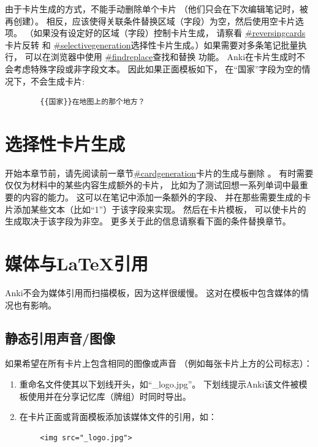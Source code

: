 \documentclass[a4paper]{book}
\newcounter{img}[chapter]
\begin{document}
	由于卡片生成的方式，不能手动删除单个卡片 （他们只会在下次编辑笔记时，被再创建）。 相反，应该使得关联条件替换区域（字段）为空，然后使用空卡片选项。 （如果没有设定好的区域（字段）控制卡片生成， 请察看
	\url{#reversingcards}卡片反转 和 \url{#selectivegeneration}选择性卡片生成。）如果需要对多条笔记批量执行， 可以在浏览器中使用
	\url{#findreplace}查找和替换 功能。
	Anki在卡片生成时不会考虑特殊字段或非字段文本。 因此如果正面模板如下， 在“国家”字段为空的情况下，不会生成卡片:
	
	\begin{shaded}\begin{verbatim}
		{{国家}}在地图上的那个地方？
		\end{verbatim}\end{shaded}
	\section{选择性卡片生成}
	开始本章节前，请先阅读前一章节\url{#cardgeneration}卡片的生成与删除 。
	有时需要仅仅为材料中的某些内容生成额外的卡片， 比如为了测试回想一系列单词中最重要的内容的能力。 这可以在笔记中添加一条额外的字段、 并在那些需要生成的卡片添加某些文本（比如“1”）于该字段来实现。 然后在卡片模板， 可以使卡片的生成取决于该字段为非空。 更多关于此的信息请察看下面的条件替换章节。
	
	\section{媒体与LaTeX引用}
	Anki不会为媒体引用而扫描模板，因为这样很缓慢。 这对在模板中包含媒体的情况也有影响。
	
	
	\subsection{静态引用声音/图像}
	如果希望在所有卡片上包含相同的图像或声音 （例如每张卡片上方的公司标志）：
	
\begin{enumerate}
	\itemsep1pt\parskip0pt
\item 重命名文件使其以下划线开头，如“\_logo.jpg”。 下划线提示Anki该文件被模板使用并在分享记忆库（牌组）时同时导出。
	
	\item 在卡片正面或背面模板添加该媒体文件的引用，如：
\end{enumerate}
	\begin{shaded}\begin{verbatim}
		<img src="_logo.jpg">
		\end{verbatim}\end{shaded}
	
\end{document}
